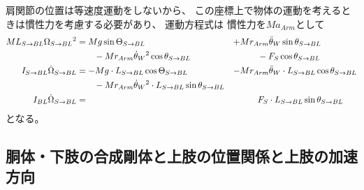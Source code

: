 \documentclass[a4paper,11pt]{jsarticle}
\begin{document}
肩関節の位置は等速度運動をしないから、
この座標上で物体の運動を考えるときは慣性力を考慮する必要があり、
運動方程式は
慣性力を$Ma_{Arm}$として
\begin{align}
  ML_{S\rightarrow BL}\Omega_{S\rightarrow BL}{}^2 
  &= Mg\sin\Theta_{S\rightarrow BL} 
  &+& Mr_{Arm}\ddot{\theta}_W\sin\theta_{S\rightarrow BL}
  \notag
  \\
  & \qquad - Mr_{Arm}\dot{\theta}_W{}^2\cos\theta_{S\rightarrow BL} 
  & & \qquad -F_S\cos\theta_{S\rightarrow BL}
  \label{eq:PB:L_start}
  \\
  I_{S\rightarrow BL}\dot\Omega_{S\rightarrow BL}{} 
  &= -Mg \cdot L_{S\rightarrow BL}\cos\Theta_{S\rightarrow BL}
  &-& Mr_{Arm}\ddot{\theta}_W \cdot L_{S\rightarrow BL} \cos\theta_{S\rightarrow BL}
  \notag
  \\
  & \qquad - Mr_{Arm}\dot{\theta}_W{}^2 \cdot L_{S\rightarrow BL} \sin\theta_{S\rightarrow BL}
  & &
  \label{eq:PB:I_start}
  \\
  I_{BL}\dot\Omega_{S\rightarrow BL}{} 
  &= 
  & & \qquad F_S \cdot L_{S\rightarrow BL} \sin\theta_{S\rightarrow BL}
  \label{eq:PB:IG_start}
\end{align}
となる。

\subsection{胴体・下肢の合成剛体と上肢の位置関係と上肢の加速方向}
\end{document}
